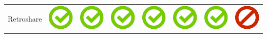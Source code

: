 \documentclass[10pt,foldmark,tumble]{leaflet}
\begin{document}
\begin{center}
{{\begin{tabular}{ L{2cm} | C{2cm} | C{2cm} | C{2cm} | C{2cm} | C{2cm} | C{2cm} | C{2cm} }
Retroshare & \includegraphics[scale=0.1]{pics/haken.png} & \includegraphics[scale=0.1]{pics/haken.png} & \includegraphics[scale=0.1]{pics/haken.png} & \includegraphics[scale=0.1]{pics/haken.png} & \includegraphics[scale=0.1]{pics/haken.png} & \includegraphics[scale=0.1]{pics/haken.png} & \includegraphics[scale=0.1]{pics/nohaken.png} \tabularnewline

\end{tabular}}}
\end{center}
\end{document}
